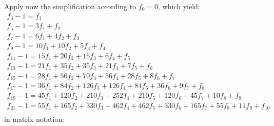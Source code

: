     
Apply now the simplification according to $f_{0}=0$, which yield:
\begin{displaymath}
    \begin{array}{c}f_{3} - 1 = f_{1}\\
    f_{5} - 1 = 3 f_{1} + f_{2}\\
    f_{7} - 1 = 6 f_{1} + 4 f_{2} + f_{3}\\
    f_{9} - 1 = 10 f_{1} + 10 f_{2} + 5 f_{3} + f_{4}\\
    f_{11} - 1 = 15 f_{1} + 20 f_{2} + 15 f_{3} + 6 f_{4} + f_{5}\\
    f_{13} - 1 = 21 f_{1} + 35 f_{2} + 35 f_{3} + 21 f_{4} + 7 f_{5} + f_{6}\\
    f_{15} - 1 = 28 f_{1} + 56 f_{2} + 70 f_{3} + 56 f_{4} + 28 f_{5} + 8 f_{6} + f_{7}\\
    f_{17} - 1 = 36 f_{1} + 84 f_{2} + 126 f_{3} + 126 f_{4} + 84 f_{5} + 36 f_{6} + 9 f_{7} + f_{8}\\
    f_{19} - 1 = 45 f_{1} + 120 f_{2} + 210 f_{3} + 252 f_{4} + 210 f_{5} + 120 f_{6} + 45 f_{7} + 10 f_{8} + f_{9}\\
    f_{21} - 1 = 55 f_{1} + 165 f_{2} + 330 f_{3} + 462 f_{4} + 462 f_{5} + 330 f_{6} + 165 f_{7} + 55 f_{8} + 11 f_{9} + f_{10}\\
    \end{array}
\end{displaymath}
in matrix notation:
